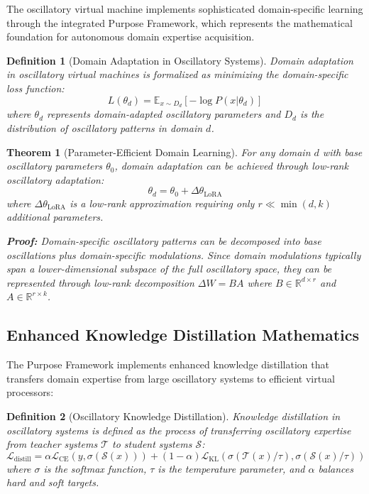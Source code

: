 \documentclass[12pt,a4paper]{article}
\newtheorem{theorem}{Theorem}
\newtheorem{definition}{Definition}
\begin{document}
The oscillatory virtual machine implements sophisticated domain-specific learning through the integrated Purpose Framework, which represents the mathematical foundation for autonomous domain expertise acquisition.

\begin{definition}[Domain Adaptation in Oscillatory Systems]
Domain adaptation in oscillatory virtual machines is formalized as minimizing the domain-specific loss function:
\begin{equation}
L(\theta_d) = \mathbb{E}_{x \sim D_d}[-\log P(x|\theta_d)]
\end{equation}
where $\theta_d$ represents domain-adapted oscillatory parameters and $D_d$ is the distribution of oscillatory patterns in domain $d$.
\end{definition}

\begin{theorem}[Parameter-Efficient Domain Learning]
For any domain $d$ with base oscillatory parameters $\theta_0$, domain adaptation can be achieved through low-rank oscillatory adaptation:
\begin{equation}
\theta_d = \theta_0 + \Delta\theta_{\text{LoRA}}
\end{equation}
where $\Delta\theta_{\text{LoRA}}$ is a low-rank approximation requiring only $r \ll \min(d, k)$ additional parameters.

\textbf{Proof:} 
Domain-specific oscillatory patterns can be decomposed into base oscillations plus domain-specific modulations. Since domain modulations typically span a lower-dimensional subspace of the full oscillatory space, they can be represented through low-rank decomposition $\Delta W = BA$ where $B \in \mathbb{R}^{d \times r}$ and $A \in \mathbb{R}^{r \times k}$.
\end{theorem}

\subsection{Enhanced Knowledge Distillation Mathematics}

The Purpose Framework implements enhanced knowledge distillation that transfers domain expertise from large oscillatory systems to efficient virtual processors:

\begin{definition}[Oscillatory Knowledge Distillation]
Knowledge distillation in oscillatory systems is defined as the process of transferring oscillatory expertise from teacher systems $\mathcal{T}$ to student systems $\mathcal{S}$:
\begin{equation}
\mathcal{L}_{\text{distill}} = \alpha \mathcal{L}_{\text{CE}}(y, \sigma(\mathcal{S}(x))) + (1-\alpha) \mathcal{L}_{\text{KL}}(\sigma(\mathcal{T}(x)/\tau), \sigma(\mathcal{S}(x)/\tau))
\end{equation}
where $\sigma$ is the softmax function, $\tau$ is the temperature parameter, and $\alpha$ balances hard and soft targets.
\end{definition}
\end{document}
